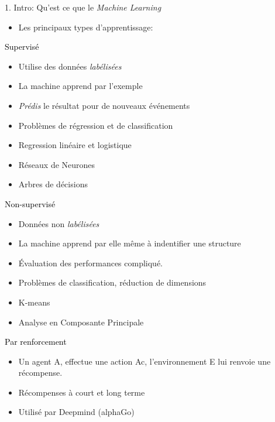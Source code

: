 \begin{frame}{1. Intro: Qu'est ce que le \textit{Machine Learning}}
  \begin{itemize}
  \item Les principaux types d'apprentissage:
  \end{itemize}
  \hspace{0.25\textwidth}
  \begin{beamerboxesrounded}[scheme=suppervise,width=0.5\textwidth]{\textcolor{black}{Supervisé}}
    \begin{itemize}
      \tiny
    \item Utilise des données \textit{labélisées}
    \item La machine apprend par l'exemple
    \item \textit{Prédis} le résultat pour de nouveaux événements
    \item Problèmes de régression et de classification
    \item Regression linéaire et logistique
    \item Réseaux de Neurones
    \item Arbres de décisions
    \end{itemize}
  \end{beamerboxesrounded}

  \vfill
  
  \begin{minipage}{.5\textwidth}
    \begin{beamerboxesrounded}[scheme=suppervise,width=0.95\textwidth]{\textcolor{black}{Non-supervisé}}
      \begin{itemize}
        \tiny
      \item Données non \textit{labélisées}
      \item La machine apprend par elle même à indentifier une structure
      \item Évaluation des performances compliqué.
      \item Problèmes de classification, réduction de dimensions
      \item K-means
      \item Analyse en Composante Principale
      \end{itemize}
    \end{beamerboxesrounded}
  \end{minipage}
  \hfill
  \begin{minipage}{.5\textwidth}
    \begin{beamerboxesrounded}[scheme=suppervise,width=0.95\textwidth]{\textcolor{black}{Par renforcement}}
      \vspace{0.5cm}
      \begin{itemize}
        \tiny
      \item Un agent A, effectue une action Ac, l'environnement E lui renvoie une récompense.
      \item Récompenses à court et long terme
      \item Utilisé par Deepmind (alphaGo)
      \end{itemize}
      \vspace{0.5cm}
    \end{beamerboxesrounded}
  \end{minipage}  
\end{frame}
